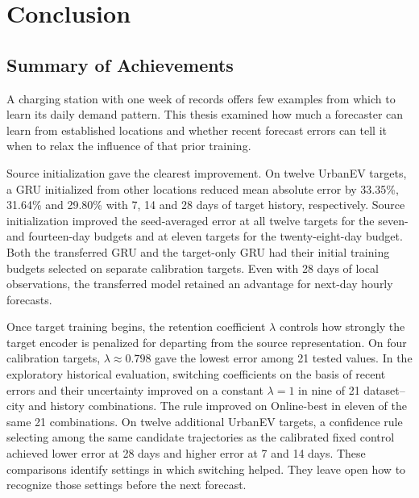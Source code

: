 \chapter{Conclusion}\label{chap:conclusion}

\section{Summary of Achievements}

A charging station with one week of records offers few examples from which to learn its daily demand pattern. This thesis examined how much a forecaster can learn from established locations and whether recent forecast errors can tell it when to relax the influence of that prior training.

Source initialization gave the clearest improvement. On twelve UrbanEV targets, a GRU initialized from other locations reduced mean absolute error by 33.35\%, 31.64\% and 29.80\% with 7, 14 and 28 days of target history, respectively. Source initialization improved the seed-averaged error at all twelve targets for the seven- and fourteen-day budgets and at eleven targets for the twenty-eight-day budget. Both the transferred GRU and the target-only GRU had their initial training budgets selected on separate calibration targets. Even with 28 days of local observations, the transferred model retained an advantage for next-day hourly forecasts.

Once target training begins, the retention coefficient $\lambda$ controls how strongly the target encoder is penalized for departing from the source representation. On four calibration targets, $\lambda \approx 0.798$ gave the lowest error among 21 tested values. In the exploratory historical evaluation, switching coefficients on the basis of recent errors and their uncertainty improved on a constant $\lambda=1$ in nine of 21 dataset--city and history combinations. The rule improved on Online-best in eleven of the same 21 combinations. On twelve additional UrbanEV targets, a confidence rule selecting among the same candidate trajectories as the calibrated fixed control achieved lower error at 28 days and higher error at 7 and 14 days. These comparisons identify settings in which switching helped. They leave open how to recognize those settings before the next forecast.

